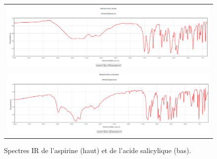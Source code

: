 \documentclass[11pt,a4paper]{report}
\begin{document}
\begin{figure}[h!]
	\begin{center}
		\begin{tabular}{c}
  		\includegraphics[scale = 0.6]{IR_aspirine.png} \\
   		\includegraphics[scale = 0.6]{IR_acidesalicylique.png}\\
	    \end{tabular}
		\caption{Spectres IR de l'aspirine (haut) et de l'acide salicylique (bas).}
	\end{center}
\end{figure}
\end{document}
